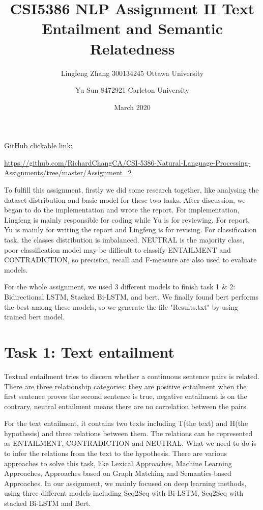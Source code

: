 \documentclass{article}
\title{CSI5386 NLP Assignment II Text Entailment and Semantic Relatedness}
\author{Lingfeng Zhang 300134245 Ottawa University \and
Yu Sun 8472921 Carleton University}
\date{March 2020}
\begin{document}
\maketitle

GitHub clickable link: 

\href{https://github.com/RichardChangCA/CSI-5386-Natural-Language-Processing-Assignments/tree/master/Assignment_2}{\url{https://github.com/RichardChangCA/CSI-5386-Natural-Language-Processing-Assignments/tree/master/Assignment_2}}

\noindent
To fulfill this assignment, firstly we did some research together, like analysing the dataset distribution and basic model for these two tasks. After discussion, we began to do the implementation and wrote the report. 
For implementation, Lingfeng is mainly responsible for coding while Yu is for reviewing. 
For report, Yu is mainly for writing the report and Lingfeng is for revising. 
For classification task, the classes distribution is imbalanced. NEUTRAL is the majority class, poor classification model may be difficult to classify ENTAILMENT and CONTRADICTION, so precision, recall and F-measure are also used to evaluate models.

For the whole assignment, we used 3 different models to finish task 1 \& 2: Bidirectional LSTM, Stacked Bi-LSTM, and bert. We finally found bert performs the best among these models, so we generate the file "Results.txt" by using trained bert model.

\section{Task 1: Text entailment}
Textual entailment tries to discern whether a continuous sentence pairs is related. There are three relationship categories: they are positive entailment when the first sentence proves the second sentence is true, negative entailment is on the contrary, neutral entailment means there are no correlation between the pairs.

For the text entailment, it contains two texts including T(the text) and H(the hypothesis) and three relations between them. The relations can be represented as ENTAILMENT, CONTRADICTION and NEUTRAL. What we need to do is to infer the relations from the text to the hypothesis. There are various approaches to solve this task, like Lexical Approaches,  Machine Learning Approaches, Approaches based on Graph Matching and Semantics-based Approaches\cite{ghuge2014survey}. In our assignment, we mainly focused on deep learning methods, using three different models including Seq2Seq with Bi-LSTM, Seq2Seq with stacked Bi-LSTM and Bert.
\end{document}

